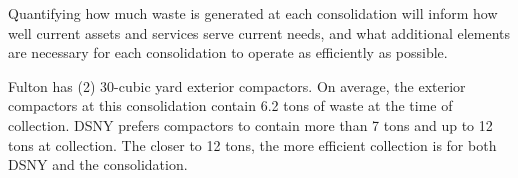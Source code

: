 
    Quantifying how much waste is generated at each consolidation will inform how well current assets and services serve current needs, and what additional elements are necessary for each consolidation to operate as efficiently as possible.
    
    Fulton has (2) 30-cubic yard exterior compactors. On average, the exterior compactors at this consolidation contain 6.2 tons of waste at the time of collection. DSNY prefers compactors to contain more than 7 tons and up to 12 tons at collection. The closer to 12 tons, the more efficient collection is for both DSNY and the consolidation.